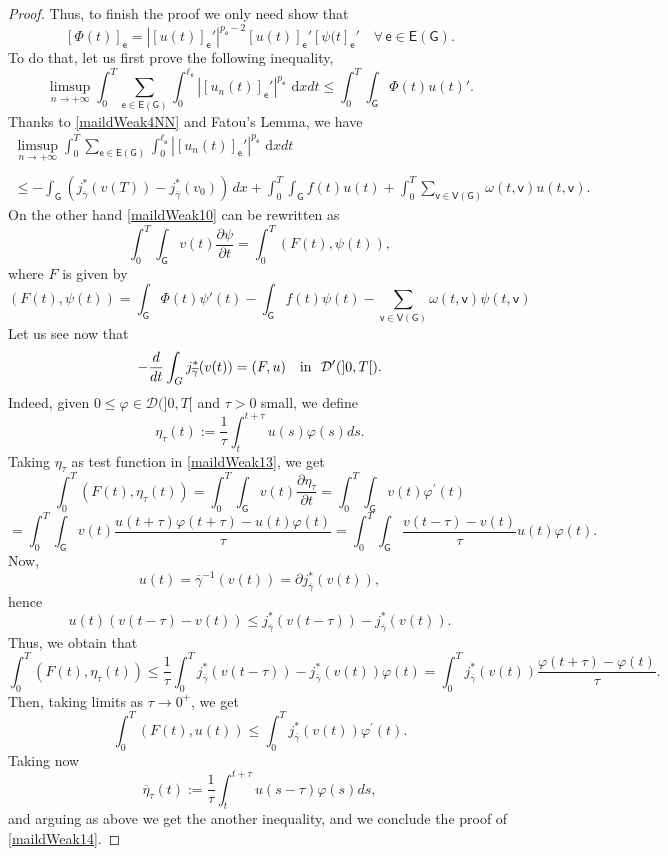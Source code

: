 \documentclass[reqno,12pt]{amsart}
\renewcommand{\d}{\,\mathrm{d}} %
\def\e{\mathsf{e}} 	%
\def\v{\mathsf{v}}	%
\newcommand{\G}{\mathsf{G}}	%
\newcommand{\V}{\mathsf{V}}	%
\newcommand{\E}{\mathsf{E}}	%
\numberwithin{equation}{section} %
\begin{document}
\begin{proof}
Thus,  to finish   the proof we only need show that
\begin{equation}\label{maildWeakF}[\Phi(t)]_\e =  |[u(t)]_\e'|^{p_\e-2}[u(t)]_\e' [\psi(t]_\e'\quad \forall \, \e \in\E(\G) .\end{equation}
To do that,  let us first prove the following inequality,
\begin{equation}\label{maildWeak11}
\limsup_{n\to+\infty} \int_0^T \sum_{\e \in\E(\G)}\int_{0}^{\ell_\e}| [u_n(t)]_\e'|^{p_\e} \, \d x dt \leq \int_0^T \int_\G \Phi(t) u(t)'.
\end{equation}
 Thanks to \eqref{maildWeak4NN} and Fatou's Lemma, we have
  \begin{equation}\label{maildWeak12}\begin{array}{c}
\displaystyle\limsup_{n\to+\infty} \displaystyle\int_0^T \sum_{\e \in\E(\G)}\int_{0}^{\ell_\e}| [u_n(t)]_\e'|^{p_\e} \, \d x dt \\ \\ \leq -  \displaystyle \int_\G  (j^*_{\overline{\gamma}}(v(T)) - j^*_{\overline{\gamma}}(v_{0}))  \, d x +\displaystyle  \int_0^T  \int_{\G} f (t) u(t) + \int_0^T \sum_{\v\in \V(\G)}  \omega(t,\v) u(t,\v). \end{array}
 \end{equation}
 On the other hand \eqref{maildWeak10} can be rewritten as
 \begin{equation}\label{maildWeak13}
 \int_0^T \int_\G v(t) \frac{\partial \psi}{\partial t} = \int_0^T (F(t),\psi(t)),
\end{equation}
 where $F$ is given by
$$(F(t),\psi(t)) =  \int_\G \Phi(t) \psi'(t) - \displaystyle    \int_{\G} f (t) \psi(t) - \sum_{\v\in \V(\G)}  \omega(t,\v) \psi(t,\v) $$
Let us see now that 
  \begin{equation}\label{maildWeak14}
- \frac{d}{dt} \int_G j^*_{\overline{\gamma}}(v(t)) = (F,u) \quad \hbox{in}  \ \ \mathcal{D}'(]0,T[).
  \end{equation}
  Indeed, given $0 \leq \varphi \in \mathcal{D}(]0,T[$ and $\tau >0$ small, we define
  $$\eta_\tau(t):= \frac{1}{\tau} \int_t^{t + \tau}  u(s) \varphi(s) ds.$$
  Taking $\eta_\tau$ as test function in \eqref{maildWeak13}, we get
$$\int_0^T (F(t),\eta_\tau(t)) =  \int_0^T \int_\G v(t) \frac{\partial \eta_\tau}{\partial t} = \int_0^T \int_\G v(t) \varphi^{\prime}(t)$$ $$= \int_0^T \int_\G v(t) \frac{u(t + \tau) \varphi(t + \tau)- u(t) \varphi(t)}{\tau}  = \int_0^T \int_\G \frac{v(t-\tau) - v(t)}{\tau} u(t) \varphi(t).$$
Now, 
$$u(t) = \overline{\gamma }^{-1}(v(t)) = \partial j^*_{\overline{\gamma}}(v(t)),$$
hence
$$u(t)(v(t-\tau) - v(t)) \leq j^*_{\overline{\gamma}}(v(t-\tau)) - j^*_{\overline{\gamma}}(v(t)).$$
Thus, we obtain that
$$\int_0^T (F(t),\eta_\tau(t)) \leq  \frac{1}{\tau}\int_0^T j^*_{\overline{\gamma}}(v(t-\tau)) - j^*_{\overline{\gamma}}(v(t)) \varphi(t)  =  \int_0^T j^*_{\overline{\gamma}}(v(t)) \frac{\varphi(t+\tau) - \varphi(t)}{\tau}.$$
Then, taking limits as $\tau \to 0^+$, we get
$$\int_0^T (F(t),u(t)) \leq  \int_0^T j^*_{\overline{\gamma}}(v(t)) \varphi^{\prime}(t).$$
Taking now
$$\overline{\eta}_\tau(t):= \frac{1}{\tau} \int_t^{t + \tau} u(s - \tau) \varphi(s) ds,$$
 and arguing  as above we get the another inequality, and we conclude the proof of \eqref{maildWeak14}.
  

\end{proof}
\end{document}
